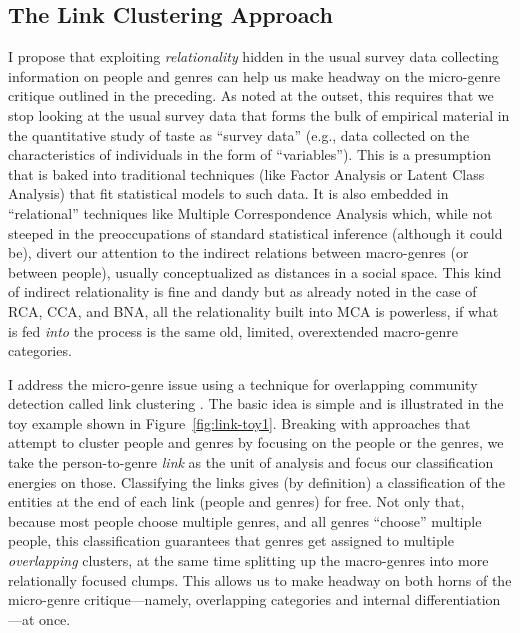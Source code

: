 \documentclass[a4paper,12pt]{extarticle}
\begin{document}
\subsection{The Link Clustering Approach}
I propose that exploiting {\em relationality} hidden in the usual survey data collecting information on people and genres can help us make headway on the micro-genre critique outlined in the preceding. As noted at the outset, this requires that we stop looking at the usual survey data that forms the bulk of empirical material in the quantitative study of taste as ``survey data'' (e.g., data collected on the characteristics of individuals in the form of ``variables''). This is a presumption that is baked into traditional techniques (like Factor Analysis or Latent Class Analysis) that fit statistical models to such data. It is also embedded in ``relational'' techniques like Multiple Correspondence Analysis which, while not steeped in the preoccupations of standard statistical inference (although it could be), divert our attention to the indirect relations between macro-genres (or between people), usually conceptualized as distances in a social space. This kind of indirect relationality is fine and dandy but as already noted in the case of RCA, CCA, and BNA, all the relationality built into MCA is powerless, if what is fed {\em into} the process is the same old, limited, overextended macro-genre categories. 

I address the micro-genre issue using a technique for overlapping community detection called link clustering \citep{ahn_etal10}. The basic idea is simple and is illustrated in the toy example shown in Figure~\ref{fig:link-toy1}. Breaking with approaches that attempt to cluster people and genres by focusing on the people or the genres, we take the person-to-genre {\em link} as the unit of analysis and focus our classification energies on those. Classifying the links gives (by definition) a classification of the entities at the end of each link (people and genres) for free. Not only that, because most people choose multiple genres, and all genres ``choose'' multiple people, this classification guarantees that genres get assigned to multiple \textit{overlapping} clusters, at the same time splitting up the macro-genres into more relationally focused clumps. This allows us to make headway on both horns of the micro-genre critique---namely, overlapping categories and internal differentiation---at once.
\end{document}
